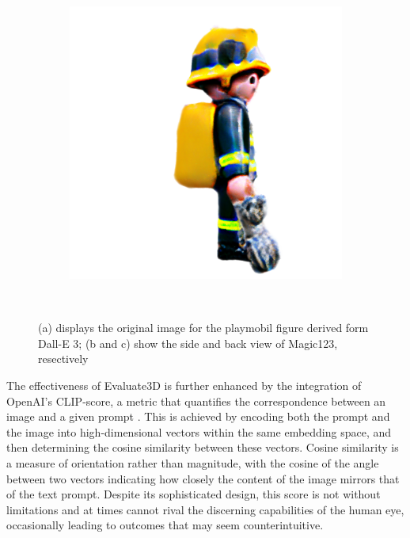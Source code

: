 \begin{figure}[ht]
\begin{subfigure}[b]{0.25\textwidth}
        \caption{}
    \end{subfigure}
    \begin{subfigure}[b]{0.25\textwidth}
        \centering
        \includegraphics[width=\textwidth]{etc/a high quality rendering of a playmobil firefighter/magic123/magic123_playmobil_coarse_right_10000_part1.png}
        \caption{}
    \end{subfigure}
    \caption{(a) displays the original image for the playmobil figure derived form Dall-E 3; (b and c) show the side and back view of Magic123, resectively}~\label{fig:inputPlaymobil}
\end{figure}

The effectiveness of Evaluate3D is further enhanced by the integration of OpenAI's CLIP-score, a metric that quantifies the correspondence between an image and a given prompt \citep{radfordCLIP}. This is achieved by encoding both the prompt and the image into high-dimensional vectors within the same embedding space, and then determining the cosine similarity between these vectors. Cosine similarity is a measure of orientation rather than magnitude, with the cosine of the angle between two vectors indicating how closely the content of the image mirrors that of the text prompt. Despite its sophisticated design, this score is not without limitations and at times cannot rival the discerning capabilities of the human eye, occasionally leading to outcomes that may seem counterintuitive.

